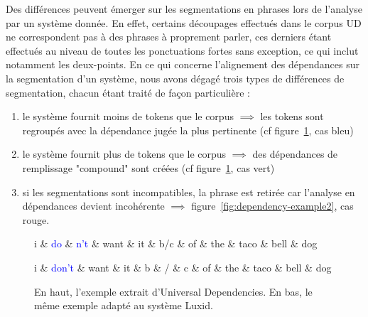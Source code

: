 \documentclass[12pt,a4paper,times,twoside,openright]{report}
\begin{document}
Des différences peuvent émerger sur les segmentations en phrases lors de l'analyse par un système donnée. En effet, certains découpages effectués dans le corpus UD ne correspondent pas à des phrases à proprement parler, ces derniers étant effectués au niveau de toutes les ponctuations fortes sans exception, ce qui inclut notamment les deux-points. En ce qui concerne l'alignement des dépendances sur la segmentation d'un système, nous avons dégagé trois types de différences de segmentation, chacun étant traité de façon particulière :
\begin{enumerate}
    \item le système fournit moins de tokens que le corpus $\implies$ les tokens sont regroupés avec la dépendance jugée la plus pertinente (cf figure\ \ref{fig:dependency-example1}, cas bleu)
    \item le système fournit plus de tokens que le corpus $\implies$ des dépendances de remplissage "compound" sont créées (cf figure\ \ref{fig:dependency-example1}, cas vert)
    \item si les segmentations sont incompatibles, la phrase est retirée car l'analyse en dépendances devient incohérente $\implies$ figure\ \ref{fig:dependency-example2}, cas rouge.
\end{enumerate}

\begin{figure}[ht!]
\centering
\begin{dependency}[theme = simple]
   \begin{deptext}[column sep=1.75em]
      i \& \textcolor{blue}{do} \& \textcolor{blue}{n't} \& want \& it \& \textcolor{green!80!black}{b/c} \& of \& the \& taco \& bell \& dog \\
   \end{deptext}
\end{dependency}
\begin{dependency}[theme = simple]
   \begin{deptext}[column sep=1.75em]
      i \& \textcolor{blue}{don't} \& want \& it \& \textcolor{green!80!black}{b} \& \textcolor{green!80!black}{/} \& \textcolor{green!80!black}{c} \& of \& the \& taco \& bell \& dog \\
   \end{deptext}
\end{dependency}
\caption{En haut, l'exemple extrait d'Universal Dependencies. En bas, le même exemple adapté au système Luxid.}
\label{fig:dependency-example1}
\end{figure}
\end{document}
